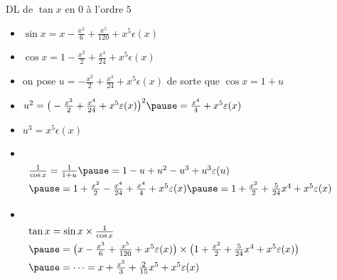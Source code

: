 \begin{frame}

\begin{exemple}
DL de $\tan x$ en $0$ à l'ordre $5$
 
 \pause
\begin{itemize}
  \item $\sin x=x-\frac{x^3}{6}+\frac{x^5}{120}+x^5\epsilon(x)$ 
\pause
  \item $\cos  x=1-\frac{x^2}{2}+\frac{x^4}{24} +x^5\epsilon(x)$
\pause
  \item on pose $u= -\frac{x^2}{2}+\frac{x^4}{24} +x^5\epsilon(x)$ de sorte que $\cos x = 1+u$
\pause
  \item $u^2 = \big(-\frac{x^2}{2}+\frac{x^4}{24} +x^5\epsilon(x)\big)^2 \pause
= \frac{x^4}{4}+x^5\epsilon(x)$
\pause
  \item $u^3 = x^5\epsilon(x)$
\pause

  \item   \ \\ \vspace*{-3ex}
$\begin{array}{l@{\vrule depth 1.2ex height 3ex width 0mm }}
\frac{1}{\cos x} = \frac{1}{1+u} \pause =1-u+u^2-u^3+u^3\epsilon(u) \\ \pause
=1+\frac{x^2}{2}-\frac{x^4}{24}+\frac{x^4}{4}+x^5\epsilon(x) \pause
=1+\frac{x^2}{2}+\frac{5}{24}x^4+x^5\epsilon(x)           
\end{array}$

\pause
  \item   \ \\ \vspace*{-3ex}
$\begin{array}{l@{\vrule depth 1.2ex height 3ex width 0mm }} 
\tan x= \sin x \times \frac1{\cos x} \\ \pause 
=  \big(x-\frac{x^3}{6}+\frac{x^5}{120}+x^5\epsilon(x)\big)\times\big(1+\frac{x^2}{2}+\frac{5}{24}x^4+x^5\epsilon(x)\big) \\ \pause
= \cdots  = x +\frac{x^3}{3}+\frac{2}{15}x^5+x^5\epsilon(x)
\end{array}$
\end{itemize}

\end{exemple}
\end{frame}



